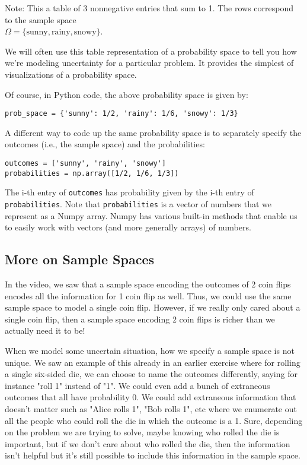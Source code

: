 \documentclass[6008notes.tex]{subfiles}
\begin{document}
Note: This a table of 3 nonnegative entries that sum to 1. The rows correspond to the sample space\\
 $\Omega =\{ \text {sunny},\text {rainy},\text {snowy}\}$.

We will often use this table representation of a probability space to tell you how we're modeling uncertainty for a particular problem. It provides the simplest of visualizations of a probability space.

Of course, in Python code, the above probability space is given by:

\begin{lstlisting}
prob_space = {'sunny': 1/2, 'rainy': 1/6, 'snowy': 1/3}
\end{lstlisting}
A different way to code up the same probability space is to separately specify the outcomes (i.e., the sample space) and the probabilities:

\begin{lstlisting}
outcomes = ['sunny', 'rainy', 'snowy']
probabilities = np.array([1/2, 1/6, 1/3])
\end{lstlisting}
The i-th entry of \texttt{outcomes} has probability given by the i-th entry of \texttt{probabilities}. Note that \texttt{probabilities} is a vector of numbers that we represent as a Numpy array. Numpy has various built-in methods that enable us to easily work with vectors (and more generally arrays) of numbers.

\subsection{More on Sample Spaces}

In the video, we saw that a sample space encoding the outcomes of 2 coin flips encodes all the information for 1 coin flip as well. Thus, we could use the same sample space to model a single coin flip. However, if we really only cared about a single coin flip, then a sample space encoding 2 coin flips is richer than we actually need it to be!

When we model some uncertain situation, how we specify a sample space is not unique. We saw an example of this already in an earlier exercise where for rolling a single six-sided die, we can choose to name the outcomes differently, saying for instance "roll 1" instead of "1". We could even add a bunch of extraneous outcomes that all have probability 0. We could add extraneous information that doesn't matter such as "Alice rolls 1", "Bob rolls 1", etc where we enumerate out all the people who could roll the die in which the outcome is a 1. Sure, depending on the problem we are trying to solve, maybe knowing who rolled the die is important, but if we don't care about who rolled the die, then the information isn't helpful but it's still possible to include this information in the sample space.
\end{document}
